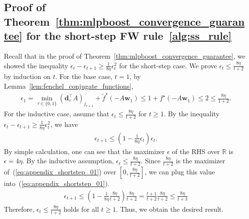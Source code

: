 \subsection{
    Proof of Theorem~\ref{thm:mlpboost_convergence_guarantee}
    for the short-step FW rule~\ref{alg:ss_rule}
}
Recall that in the proof of Theorem~\ref{thm:mlpboost_convergence_guarantee}, 
we showed the inequality 
$\epsilon_t - \epsilon_{t+1} \geq \frac{1}{8 \eta} \epsilon_t^2$ 
for the short-step case. 
We prove $\epsilon_t \leq \frac{8\eta}{t + 2}$ by induction on $t$. 
For the base case, $t = 1$, by Lemma~\ref{lem:fenchel_conjugate_functions}, 
\begin{align*}
    \epsilon_1
    = \min_{\tau \in \{0, 1\}} (\bm{d}_\tau^\top A)_{j_{\tau + 1}}
        + \tilde{f}^\star (- A\bm{w}_1)
    \leq 1 + f^\star (- A\bm{w}_1)
    \leq 2
    \leq \frac{8\eta}{1 + 2}.
\end{align*}
For the inductive case, assume that $\epsilon_t \leq \frac{8\eta}{t+2}$ 
for $t \geq 1$. 
By the inequality
$\epsilon_t - \epsilon_{t+1} \geq \frac{1}{8 \eta} \epsilon_t^2$, 
we have
\begin{align}
    \label{eq:appendix_shortstep_01}
    \epsilon_{t+1} 
    \leq \left(1 - \frac{1}{8\eta} \epsilon_t\right) \epsilon_t.
\end{align}
By simple calculation, 
one can see that the maximizer $\epsilon$ of the RHS over $\mathbb{R}$ is 
$\epsilon = 4\eta$. 
By the inductive assumption, $\epsilon_t \leq \frac{8 \eta}{t + 2}$. 
Since $\frac{8\eta}{t+2}$ is 
the maximizer of~(\ref{eq:appendix_shortstep_01}) 
over $[0, \frac{8\eta}{t+2}]$, 
we can plug this value into~(\ref{eq:appendix_shortstep_01}). 
\begin{align*}
    \epsilon_{t+1} 
    \leq \left(1 - \frac{1}{8\eta} \frac{8\eta}{t+2}\right)
    \frac{8\eta}{t+2}
    = \frac{t+1}{t+2} \frac{8\eta}{t+2}
    \leq \frac{8\eta}{t+3}
\end{align*}
Therefore, $\epsilon_{t} \leq \frac{8\eta}{t+2}$ holds for all $t \geq 1$. 
Thus, we obtain the desired result. 
